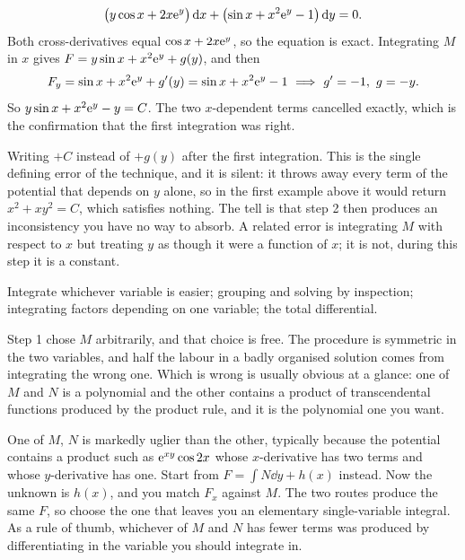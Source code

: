 \begin{worked}
\[\bigl(y\cos x+2x\mathrm{e}^{y}\bigr)\,\mathrm{d} x+\bigl(\sin x+x^{2}\mathrm{e}^{y}-1\bigr)\,\mathrm{d} y=0.\]
Both cross-derivatives equal $\cos x+2x\mathrm{e}^{y}$, so the equation is exact. Integrating $M$ in $x$ gives $F=y\sin x+x^{2}\mathrm{e}^{y}+g(y)$, and then
\[F_y=\sin x+x^{2}\mathrm{e}^{y}+g'(y)=\sin x+x^{2}\mathrm{e}^{y}-1\ \Longrightarrow\ g'=-1,\ g=-y.\]
So $y\sin x+x^{2}\mathrm{e}^{y}-y=C$. The two $x$-dependent terms cancelled exactly, which is the confirmation that the first integration was right.
\end{worked}

\begin{trap}
Writing $+C$ instead of $+g(y)$ after the first integration. This is the single defining error of the technique, and it is silent: it throws away every term of the potential that depends on $y$ alone, so in the first example above it would return $x^{2}+xy^{2}=C$, which satisfies nothing. The tell is that step 2 then produces an inconsistency you have no way to absorb. A related error is integrating $M$ with respect to $x$ but treating $y$ as though it were a function of $x$; it is not, during this step it is a constant.
\end{trap}

\begin{seealsob}Integrate whichever variable is easier; grouping and solving by inspection; integrating factors depending on one variable; the total differential.\end{seealsob}

Step 1 chose $M$ arbitrarily, and that choice is free. The procedure is symmetric in the two variables, and half the labour in a badly organised solution comes from integrating the wrong one. Which is wrong is usually obvious at a glance: one of $M$ and $N$ is a polynomial and the other contains a product of transcendental functions produced by the product rule, and it is the polynomial one you want.

\cue One of $M$, $N$ is markedly uglier than the other, typically because the potential contains a product such as $\mathrm{e}^{xy}\cos2x$ whose $x$-derivative has two terms and whose $y$-derivative has one.
\method Start from $F=\int N\dd y+h(x)$ instead. Now the unknown is $h(x)$, and you match $F_x$ against $M$. The two routes produce the same $F$, so choose the one that leaves you an elementary single-variable integral. As a rule of thumb, whichever of $M$ and $N$ has fewer terms was produced by differentiating in the variable you should integrate in.

